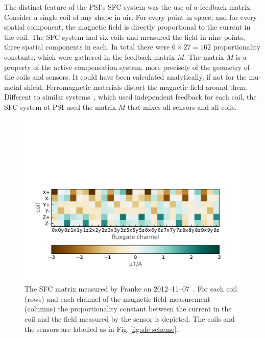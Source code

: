 The distinct feature of the PSI's SFC system was the use of a feedback matrix.
Consider a single coil of any shape in air. For every point in space, and for every spatial component, the magnetic field is directly proportional to the current in the coil. The SFC system had six coils and measured the field in nine points, three spatial components in each. In total there were $6 \times 27 = 162$ proportionality constants, which were gathered in the feedback matrix $M$. The matrix $M$ is a property of the active compensation system, more precisely of the geometry of the coils and sensors. It could have been calculated analytically, if not for the mu-metal shield. Ferromagnetic materials distort the magnetic field around them.
Different to similar systems~\cite{Kelha1982,Brake1991,Spemann2003,Brys2005,Kobayashi2012,Voigt2013}, which used independent feedback for each coil, the SFC system at PSI used the matrix $M$ that mixes all sensors and all coils. 

\begin{figure}
  \centering
  \includegraphics[width=.8\linewidth]{gfx/nEDM_SFC/nEDM_SFC_matrix.pdf}
  \caption{The SFC matrix measured by Franke on 2012--11--07~\cite{Franke2013}. For each coil (rows) and each channel of the magnetic field measurement (columns) the proportionality constant between the current in the coil and the field measured by the sensor is depicted. The coils and the sensors are labelled as in Fig.\,\ref{fig:sfc-scheme}.}\label{fig:nEDM_SFC_matrix}
\end{figure}


